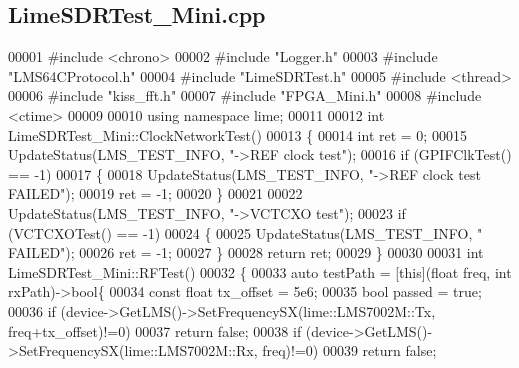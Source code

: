 \subsection{Lime\+S\+D\+R\+Test\+\_\+\+Mini.\+cpp}
\label{LimeSDRTest__Mini_8cpp_source}

\begin{DoxyCode}
00001 \textcolor{preprocessor}{#include <chrono>}
00002 \textcolor{preprocessor}{#include "Logger.h"}
00003 \textcolor{preprocessor}{#include "LMS64CProtocol.h"}
00004 \textcolor{preprocessor}{#include "LimeSDRTest.h"}
00005 \textcolor{preprocessor}{#include <thread>}
00006 \textcolor{preprocessor}{#include "kiss_fft.h"}
00007 \textcolor{preprocessor}{#include "FPGA_Mini.h"}
00008 \textcolor{preprocessor}{#include <ctime>}
00009 
00010 \textcolor{keyword}{using namespace }lime;
00011 
00012 \textcolor{keywordtype}{int} LimeSDRTest_Mini::ClockNetworkTest()
00013 \{
00014     \textcolor{keywordtype}{int} ret = 0;
00015     UpdateStatus(LMS_TEST_INFO, \textcolor{stringliteral}{"->REF clock test"});
00016     \textcolor{keywordflow}{if} (GPIFClkTest() == -1)
00017     \{
00018         UpdateStatus(LMS_TEST_INFO, \textcolor{stringliteral}{"->REF clock test FAILED"});
00019         ret = -1;
00020     \}
00021 
00022     UpdateStatus(LMS_TEST_INFO, \textcolor{stringliteral}{"->VCTCXO test"});
00023     \textcolor{keywordflow}{if} (VCTCXOTest() == -1)
00024     \{
00025         UpdateStatus(LMS_TEST_INFO, \textcolor{stringliteral}{"  FAILED"});
00026         ret = -1;
00027     \}
00028     \textcolor{keywordflow}{return} ret;
00029 \}
00030 
00031 \textcolor{keywordtype}{int} LimeSDRTest_Mini::RFTest()
00032 \{
00033     \textcolor{keyword}{auto} testPath = [\textcolor{keyword}{this}](\textcolor{keywordtype}{float} freq, \textcolor{keywordtype}{int} rxPath)->\textcolor{keywordtype}{bool}\{
00034         \textcolor{keyword}{const} \textcolor{keywordtype}{float} tx\_offset = 5e6;
00035         \textcolor{keywordtype}{bool} passed = \textcolor{keyword}{true};
00036         \textcolor{keywordflow}{if} (device->GetLMS()->SetFrequencySX(lime::LMS7002M::Tx, freq+tx\_offset)!=0)
00037             \textcolor{keywordflow}{return} \textcolor{keyword}{false};
00038         \textcolor{keywordflow}{if} (device->GetLMS()->SetFrequencySX(lime::LMS7002M::Rx, freq)!=0)
00039             \textcolor{keywordflow}{return} \textcolor{keyword}{false};

\end{DoxyCode}
